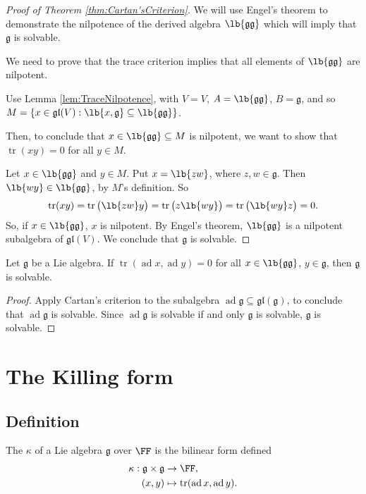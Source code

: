 \documentclass{article}
\DeclarePairedDelimiter\lb\lbrack\rbrack
\DeclareMathOperator{\tr}{tr}
\newcommand*\ad{\operatorname{ad}}
\newcommand*\frkg{{\ensuremath{\mathfrak{g}}}}
\newcommand*\gl{\ensuremath{\mathfrak{gl}}}
\begin{document}
\begin{proof}[Proof of Theorem \ref{thm:Cartan'sCriterion}]
    We will use Engel's theorem to demonstrate the nilpotence of the derived algebra $\lb{\frkg\frkg}$ which will imply that $\frkg$ is solvable.

    We need to prove that the trace criterion implies that all elements of $\lb{\frkg\frkg}$ are nilpotent.

    Use Lemma \ref{lem:TraceNilpotence}, with $V = V$, $A = \lb{\frkg\frkg}$, $B = \frkg$, and so $M = \{x \in \gl(V): \lb{x,\frkg} \subseteq \lb{\frkg\frkg}\}$.

    Then, to conclude that $x \in \lb{\frkg\frkg} \subseteq M$ is nilpotent, we want to show that $\tr(xy) = 0$ for all $y \in M$.

    Let $x \in \lb{\frkg\frkg}$ and $y \in M$.
    Put $x = \lb{zw}$, where $z,w \in \frkg$.
    Then $\lb{wy} \in \lb{\frkg\frkg}$, by $M$'s definition.
    So
    \[
        \tr(xy)
        =
        \tr\big(\lb{zw}y\big)
        =
        \tr\big(z\lb{wy}\big)
        =
        \tr\big(\lb{wy}z\big)
        =
        0.
    \]
    So, if $x \in \lb{\frkg\frkg}$, $x$ is nilpotent.
    By Engel's theorem, $\lb{\frkg\frkg}$ is a nilpotent subalgebra of $\gl(V)$.
    We conclude that $\frkg$ is solvable.
\end{proof}

\begin{corollary}
    Let $\frkg$ be a Lie algebra.
    If $\tr(\ad x, \ad y) = 0$ for all $x \in \lb{\frkg\frkg}$, $y \in \frkg$, then $\frkg$ is solvable.
\end{corollary}

\begin{proof}
    Apply Cartan's criterion to the subalgebra $\ad \frkg \subseteq \gl(\frkg)$, to conclude that $\ad \frkg$ is solvable.
    Since $\ad \frkg$ is solvable if and only $\frkg$ is solvable, $\frkg$ is solvable.
\end{proof}


\section{The Killing form \cite[\S 5]{Hum72}}

\subsection{Definition}

\begin{definition}
    The  $\kappa$ of a Lie algebra $\frkg$ over $\FF$ is the bilinear form defined
    \begin{align*}
        \kappa:
        \frkg \times \frkg 
        &\to
        \FF, \\
        (x, y)
        &\mapsto
        \tr(\ad x, \ad y).
    \end{align*}
\end{definition}
\end{document}
